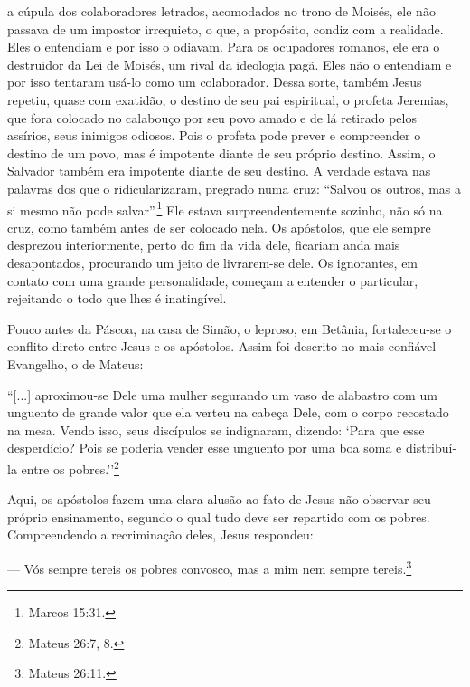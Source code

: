a cúpula dos colaboradores letrados, acomodados no trono de Moisés, ele
não passava de um impostor irrequieto, o que, a propósito, condiz com a
realidade. Eles o entendiam e por isso o odiavam. Para os ocupadores
romanos, ele era o destruidor da Lei de Moisés, um rival da ideologia
pagã. Eles não o entendiam e por isso tentaram usá-lo como um
colaborador. Dessa sorte, também Jesus repetiu, quase com exatidão, o
destino de seu pai espiritual, o profeta Jeremias, que fora colocado no
calabouço por seu povo amado e de lá retirado pelos assírios, seus
inimigos odiosos. Pois o profeta pode prever e compreender o destino de
um povo, mas é impotente diante de seu próprio destino. Assim, o
Salvador também era impotente diante de seu destino. A verdade estava
nas palavras dos que o ridicularizaram, pregrado numa cruz: ``Salvou os
outros, mas a si mesmo não pode salvar''.\footnote{Marcos 15:31.} Ele
estava surpreendentemente sozinho, não só na cruz, como também antes de
ser colocado nela. Os apóstolos, que ele sempre desprezou interiormente,
perto do fim da vida dele, ficariam anda mais desapontados, procurando
um jeito de livrarem-se dele. Os ignorantes, em contato com uma grande
personalidade, começam a entender o particular, rejeitando o todo que
lhes é inatingível.

Pouco antes da Páscoa, na casa de Simão, o leproso, em Betânia,
fortaleceu-se o conflito direto entre Jesus e os apóstolos. Assim foi
descrito no mais confiável Evangelho, o de Mateus:

``{[}...{]} aproximou-se Dele uma mulher segurando um vaso de alabastro
com um unguento de grande valor que ela verteu na cabeça Dele, com o
corpo recostado na mesa. Vendo isso, seus discípulos se indignaram,
dizendo: `Para que esse desperdício? Pois se poderia vender esse
unguento por uma boa soma e distribuí-la entre os pobres.''\footnote{Mateus
  26:7, 8.}

Aqui, os apóstolos fazem uma clara alusão ao fato de Jesus não observar
seu próprio ensinamento, segundo o qual tudo deve ser repartido com os
pobres. Compreendendo a recriminação deles, Jesus respondeu:

--- Vós sempre tereis os pobres convosco, mas a mim nem sempre
tereis.\footnote{Mateus 26:11.}

